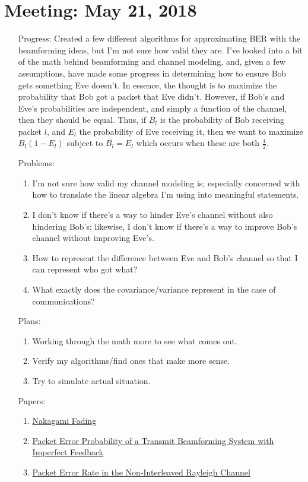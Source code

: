 \documentclass[11pt]{article}
\begin{document}
\section{Meeting: May 21, 2018}
\begin{itemize}
\item[Progress:]
Created a few different algorithms for approximating BER with the beamforming ideas, but I'm not sure how valid they are.  I've looked into a bit of the math behind beamforming and channel modeling, and, given a few assumptions, have made some progress in determining how to ensure Bob gets something Eve doesn't.  In essence, the thought is to maximize the probability that Bob got a packet that Eve didn't.  However, if Bob's and Eve's probabilities are independent, and simply a function of the channel, then they should be equal.  Thus, if $B_{l}$ is the probability of Bob receiving packet $l$, and $E_{l}$ the probability of Eve receiving it, then we want to maximize $B_{l}(1-E_{l})$ subject to $B_{l} = E_{l}$ which occurs when these are both $\frac{1}{2}$.

\item[Problems:]
\begin{enumerate}
\item I'm not sure how valid my channel modeling is; especially concerned with how to translate the linear algebra I'm using into meaningful statements.
\item I don't know if there's a way to hinder Eve's channel without also hindering Bob's; likewise, I don't know if there's a way to improve Bob's channel without improving Eve's.
\item How to represent the difference between Eve and Bob's channel so that I can represent who got what?
\item What exactly does the covariance/variance represent in the case of communications?
\end{enumerate}

\item[Plans:]
\begin{enumerate}
\item Working through the math more to see what comes out.
\item Verify my algorithms/find ones that make more sense.
\item Try to simulate actual situation.
\end{enumerate}

\item[Papers:]
\begin{enumerate}
\item \href{https://link.springer.com/content/pdf/10.1007\%2F3-540-36087-5_43.pdf}{Nakagami Fading}
\item \href{https://www.ece.ucsb.edu/~yoga/tsp.pdf}{Packet Error Probability of a Transmit Beamforming System with Imperfect Feedback}
\item \href{https://ieeexplore.ieee.org/stamp/stamp.jsp?arnumber=380184}{Packet Error Rate in the Non-Interleaved Rayleigh Channel}
\end{enumerate}

\end{itemize}\newpage
\end{document}
